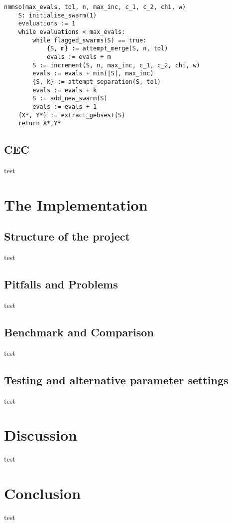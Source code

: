 \begin{verbatim}
nmmso(max_evals, tol, n, max_inc, c_1, c_2, chi, w)
    S: initialise_swarm(1)
    evaluations := 1
    while evaluations < max_evals:
        while flagged_swarms(S) == true:
            {S, m} := attempt_merge(S, n, tol)
            evals := evals + m
        S := increment(S, n, max_inc, c_1, c_2, chi, w)
        evals := evals + min(|S|, max_inc)
        {S, k} := attempt_separation(S, tol)
        evals := evals + k
        S := add_new_swarm(S)
        evals := evals + 1
    {X*, Y*} := extract_gebsest(S)
    return X*,Y*
\end{verbatim}

\subsection{CEC}
\label{cec}

test

\pagebreak 

\section{The Implementation}
\label{theimplementation}

\subsection{Structure of the project}
\label{structureoftheproject}

test ~\citep{fieldsend_2014}

\subsection{Pitfalls and Problems}
\label{pitfallsandproblems}

test

\subsection{Benchmark and Comparison}
\label{benchmarkandcomparison}

test

\subsection{Testing and alternative parameter settings}
\label{testingandalternativeparametersettings}

test

\section{Discussion}
\label{discussion}

test

\section{Conclusion}
\label{conclusion}

test
